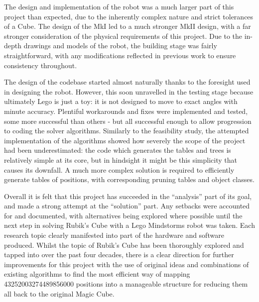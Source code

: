 \documentclass{report}
\begin{document}
    The design and implementation of the robot was a much larger part of this project than expected, due to the inherently complex nature and strict tolerances of a Cube. The design of the MkI led to a much stronger MkII design, with a far stronger consideration of the physical requirements of this project. Due to the in-depth drawings and models of the robot, the building stage was fairly straightforward, with any modifications reflected in previous work to ensure consistency throughout.
    
    The design of the codebase started almost naturally thanks to the foresight used in designing the robot. However, this soon unravelled in the testing stage because ultimately Lego is just a toy: it is not designed to move to exact angles with minute accuracy. Plentiful workarounds and fixes were implemented and tested, some more successful than others - but all successful enough to allow progression to coding the solver algorithms. Similarly to the feasibility study, the attempted implementation of the algorithms showed how severely the scope of the project had been underestimated: the code which generates the tables and trees is relatively simple at its core, but in hindsight it might be this simplicity that causes its downfall. A much more complex solution is required to efficiently generate tables of positions, with corresponding pruning tables and object classes.
    
   Overall it is felt that this project has succeeded in the \enquote{analysis} part of its goal, and made a strong attempt at the \enquote{solution} part. Any setbacks were accounted for and documented, with alternatives being explored where possible until the next step in solving Rubik's Cube with a Lego Mindstorms robot was taken. Each research topic clearly manifested into part of the hardware and software produced. Whilst the topic of Rubik's Cube has been thoroughly explored and tapped into over the past four decades, there is a clear direction for further improvements for this project with the use of original ideas and combinations of existing algorithms to find the most efficient way of mapping \num{43252003274489856000} positions into a manageable structure for reducing them all back to the original Magic Cube.
    
    
    \newpage
    \printbibliography
    
\end{document}
